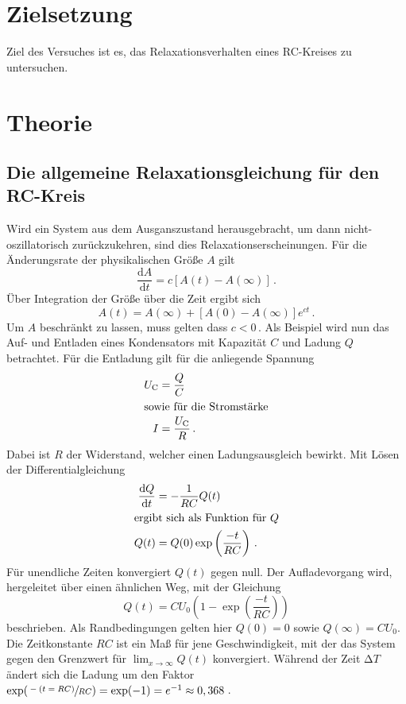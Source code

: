 \section{Zielsetzung}
Ziel des Versuches ist es, das Relaxationsverhalten eines RC-Kreises zu untersuchen.

\section{Theorie}
\label{sec:Theorie}
\subsection{Die allgemeine Relaxationsgleichung für den RC-Kreis}
Wird ein System aus dem Ausganszustand herausgebracht, um dann
nicht-oszillatorisch zurückzukehren, sind dies Relaxationserscheinungen.
Für die Änderungsrate der physikalischen Größe $A$ gilt 
\begin{equation}
    \frac{\text{d}A}{\text{d}t}=c[A(t)-A(\infty)]\,.
\end{equation}
Über Integration der Größe über die Zeit ergibt sich 
\begin{equation}
    A(t)=A(\infty)+[A(0)-A(\infty)]e^{ct}\,.
\end{equation}
Um $A$ beschränkt zu lassen, muss gelten dass $c<0$\,.
Als Beispiel wird nun das Auf- und Entladen eines Kondensators
mit Kapazität $C$ und Ladung $Q$ betrachtet.
Für die Entladung gilt für die anliegende Spannung 
\begin{align}
    U_\text{C}&=\frac{Q}{C}\\
    \intertext{sowie für die Stromstärke}
    I&=\frac{U_\text{C}}{R}\,.
\end{align}
Dabei ist $R$ der Widerstand, welcher einen Ladungsausgleich bewirkt.
Mit Lösen der Differentialgleichung 
\begin{align}
    \frac{\text{d}Q}{\text{d}t}&=-\frac{1}{RC}Q(t)\\
    \intertext{ergibt sich als Funktion für $Q$}
    Q(t)&=Q(0)\exp\left(\frac{-t}{RC}\right)\,.
\end{align}
Für unendliche Zeiten konvergiert $Q(t)$ gegen null.
Der Aufladevorgang wird, hergeleitet über einen ähnlichen Weg,
mit der Gleichung 
\begin{equation}
    Q(t)=CU_0(1-\exp\left(\frac{-t}{RC}\right))
\end{equation}
beschrieben.
Als Randbedingungen gelten hier $Q(0)=0$ sowie $Q(\infty)=CU_0$.
Die Zeitkonstante $RC$ ist ein Maß für jene Geschwindigkeit, mit der 
das System gegen den Grenzwert für $\displaystyle \lim_{x \to \infty}Q(t)$
konvergiert. Während der Zeit $\increment T$ ändert sich die Ladung um 
den Faktor $\exp(\sfrac{-(t=RC)}{RC})=\exp(-1)=e^{-1}\approx0,368$\,. 
